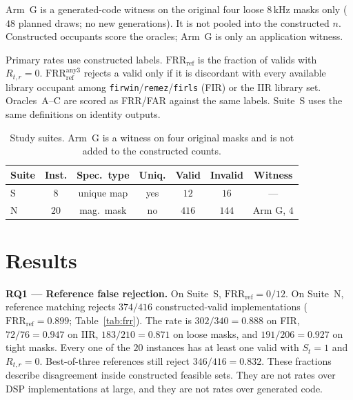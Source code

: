 \documentclass{article}
\begin{document}
Arm~G is a generated-code witness on the original four loose
$8\,\mathrm{kHz}$ masks only ($48$ planned draws; no new generations).
It is not pooled into the constructed $n$.
Constructed occupants score the oracles; Arm~G is only an
application witness.

Primary rates use constructed labels.
$\mathrm{FRR}_{\mathrm{ref}}$ is the fraction of valids with
$R_{t,r}=0$.
$\mathrm{FRR}_{\mathrm{ref}}^{\mathrm{any3}}$ rejects a valid only if
it is discordant with every available library occupant among
\texttt{firwin}/\texttt{remez}/\texttt{firls} (FIR) or the IIR library
set.
Oracles~A--C are scored as FRR/FAR against the same labels.
Suite~S uses the same definitions on identity outputs.

\begin{table}[t]
\caption{Study suites.
Arm~G is a witness on four original masks and is not added to the
constructed counts.}
\label{tab:suite}
\centering
\footnotesize
\setlength{\tabcolsep}{2.6pt}
\begin{tabular}{@{}lcccccc@{}}
\hline
Suite & Inst. & Spec.\ type & Uniq. & Valid & Invalid & Witness \\
\hline
S & $8$ & unique map & yes & $12$ & $16$ & --- \\
N & $20$ & mag.\ mask & no & $416$ & $144$ & Arm G, $4$ \\
\hline
\end{tabular}
\end{table}

\section{Results}
\label{sec:results}

\noindent\textbf{RQ1 --- Reference false rejection.}
On Suite~S, $\mathrm{FRR}_{\mathrm{ref}}=0/12$.
On Suite~N, reference matching rejects $374/416$ constructed-valid
implementations ($\mathrm{FRR}_{\mathrm{ref}}=0.899$;
Table~\ref{tab:frr}).
The rate is $302/340=0.888$ on FIR, $72/76=0.947$ on IIR,
$183/210=0.871$ on loose masks, and $191/206=0.927$ on tight masks.
Every one of the $20$ instances has at least one valid with
$S_t=1$ and $R_{t,r}=0$.
Best-of-three references still reject $346/416=0.832$.
These fractions describe disagreement inside constructed feasible
sets.
They are not rates over DSP implementations at large, and they are not
rates over generated code.
\end{document}
